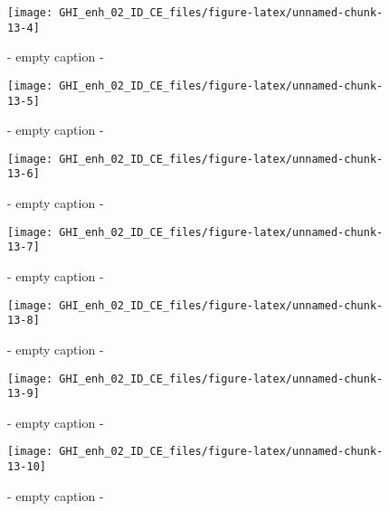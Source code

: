 \documentclass[
  10pt,
  a4paper,oneside]{article}
\begin{document}
\begin{figure}[H]

{\centering \texttt{[image: GHI\_enh\_02\_ID\_CE\_files/figure-latex/unnamed-chunk-13-4]} 

}

\caption{ - empty caption - }\label{fig:unnamed-chunk-13-4}
\end{figure}
\begin{figure}[H]

{\centering \texttt{[image: GHI\_enh\_02\_ID\_CE\_files/figure-latex/unnamed-chunk-13-5]} 

}

\caption{ - empty caption - }\label{fig:unnamed-chunk-13-5}
\end{figure}
\begin{figure}[H]

{\centering \texttt{[image: GHI\_enh\_02\_ID\_CE\_files/figure-latex/unnamed-chunk-13-6]} 

}

\caption{ - empty caption - }\label{fig:unnamed-chunk-13-6}
\end{figure}
\begin{figure}[H]

{\centering \texttt{[image: GHI\_enh\_02\_ID\_CE\_files/figure-latex/unnamed-chunk-13-7]} 

}

\caption{ - empty caption - }\label{fig:unnamed-chunk-13-7}
\end{figure}
\begin{figure}[H]

{\centering \texttt{[image: GHI\_enh\_02\_ID\_CE\_files/figure-latex/unnamed-chunk-13-8]} 

}

\caption{ - empty caption - }\label{fig:unnamed-chunk-13-8}
\end{figure}
\begin{figure}[H]

{\centering \texttt{[image: GHI\_enh\_02\_ID\_CE\_files/figure-latex/unnamed-chunk-13-9]} 

}

\caption{ - empty caption - }\label{fig:unnamed-chunk-13-9}
\end{figure}
\begin{figure}[H]

{\centering \texttt{[image: GHI\_enh\_02\_ID\_CE\_files/figure-latex/unnamed-chunk-13-10]} 

}

\caption{ - empty caption - }\label{fig:unnamed-chunk-13-10}
\end{figure}
\end{document}
